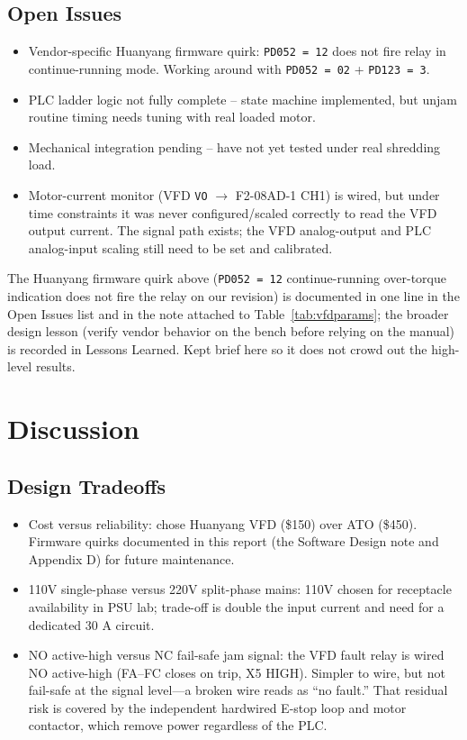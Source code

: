 \documentclass[hidelinks,12pt]{article}
\begin{document}
\subsection{Open Issues}
\begin{itemize}
    \item Vendor-specific Huanyang firmware quirk: \texttt{PD052 = 12} does not fire relay in continue-running mode. Working around with \texttt{PD052 = 02} + \texttt{PD123 = 3}.
    \item PLC ladder logic not fully complete -- state machine implemented, but unjam routine timing needs tuning with real loaded motor.
    \item Mechanical integration pending -- have not yet tested under real shredding load.
    \item Motor-current monitor (VFD \texttt{VO} $\rightarrow$ F2-08AD-1 CH1) is wired, but under time constraints it was never configured/scaled correctly to read the VFD output current. The signal path exists; the VFD analog-output and PLC analog-input scaling still need to be set and calibrated.
\end{itemize}

The Huanyang firmware quirk above (\texttt{PD052 = 12} continue-running
over-torque indication does not fire the relay on our revision) is
documented in one line in the Open Issues list and in the note attached
to Table~\ref{tab:vfdparams}; the broader design lesson (verify vendor
behavior on the bench before relying on the manual) is recorded in
Lessons Learned. Kept brief here so it does not crowd out the high-level
results.

\section{Discussion}

\subsection{Design Tradeoffs}
\begin{itemize}
    \item Cost versus reliability: chose Huanyang VFD (\$150) over ATO (\$450). Firmware quirks documented in this report (the Software Design note and Appendix D) for future maintenance.
    \item 110V single-phase versus 220V split-phase mains: 110V chosen for receptacle availability in PSU lab; trade-off is double the input current and need for a dedicated 30 A circuit.
    \item NO active-high versus NC fail-safe jam signal: the VFD fault relay is wired NO active-high (FA--FC closes on trip, X5 HIGH). Simpler to wire, but not fail-safe at the signal level---a broken wire reads as ``no fault.'' That residual risk is covered by the independent hardwired E-stop loop and motor contactor, which remove power regardless of the PLC.
\end{itemize}
\end{document}
